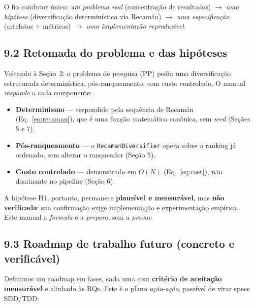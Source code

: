 \begin{pontochave}
O fio condutor único: \emph{um problema real} (concentração de resultados)
$\rightarrow$ \emph{uma hipótese} (diversificação determinística via Recamán)
$\rightarrow$ \emph{uma especificação} (artefatos + métricas) $\rightarrow$ \emph{uma
implementação reproduzível}.
\end{pontochave}

\subsection*{9.2 Retomada do problema e das hipóteses}

 Voltando à Seção~2: o problema de pesquisa (PP) pedia uma diversificação
estruturada determinística, pós-ranqueamento, com custo controlado. O manual
\emph{responde} a cada componente:

\begin{itemize}
  \item \textbf{Determinismo} --- respondido pela sequência de Recamán
        (Eq.~\ref{eq:recaman}), que é uma função matemática canônica, sem
        \emph{seed} (Seções 5 e 7).
  \item \textbf{Pós-ranqueamento} --- o \texttt{RecamanDiversifier} opera sobre o
        ranking já ordenado, sem alterar o ranqueador (Seção 5).
  \item \textbf{Custo controlado} --- demonstrado em $O(N)$ (Eq.~\ref{eq:cost}),
        não dominante no pipeline (Seção 6).
\end{itemize}

\noindent A hipótese H1, portanto, permanece \textbf{plausível e mensurável}, mas
\textbf{não verificada}: sua confirmação exige implementação e experimentação
empírica. Este manual a \emph{formula} e a \emph{prepara}, sem a \emph{provar}.

\subsection*{9.3 Roadmap de trabalho futuro (concreto e verificável)}

 Definimos um roadmap em fases, cada uma com \textbf{critério de aceitação
mensurável} e alinhado às RQs. Este é o plano \emph{ação-ação}, passível de virar
specs SDD/TDD:

